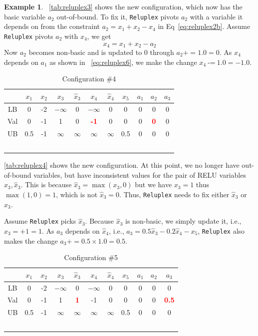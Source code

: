 \documentclass[oneside,11pt,dvipsnames]{book}
\numberwithin{equation}{section}
\theoremstyle{definition}
\newtheorem{example}{Example}[section]
\theoremstyle{remark}
\newcommand{\red}[1]{\textcolor{red}{#1}}
\newcommand{\reluplex}{\texttt{Reluplex}}
\begin{document}
\begin{example}
\begin{table}[h]
\end{table}

~\autoref{tab:reluplex3} shows the new configuration, which now has the basic variable $a_2$ out-of-bound.  To fix it, \reluplex{} pivots $a_2$ with a variable it depends on from the constraint $a_2 = x_1 + x_2 - x_4$ in Eq~\ref{eq:reluplex2b}.  Assume \reluplex{} pivots $a_2$ with $x_4$, we get
\begin{equation}\label{eq:reluplex6}
  x_4 = x_1 + x_2 - a_2
\end{equation}
Now $a_2$ becomes non-basic and is updated to 0 through $a_2+= 1.0 = 0$. As $x_4$ depends on $a_1$ as shown in ~\autoref{eq:reluplex6}, we make the change $x_4 ~\texttt{-=}~1.0 = -1.0$.


\begin{table}[h]
    \caption{Configuration \#4}\label{tab:reluplex4}
    \centering
    \small
\begin{tabular}{ccccccccccc}
     & $x_1$ & $x_2$ & $x_3$ & $\hat{x}_3$ & $x_4$ & $\hat{x}_4$ & $x_5$ &$a_1$&$a_2$&$a_3$ \\
    \midrule
    LB & 0 & -2 & $-\infty$&0&$-\infty$& 0 & 0 & 0 & 0 &0\\
    Val& 0 & -1 & 1 & 0 & \textbf{\red{-1}} & 0 & 0 & 0 & \textbf{\red{0}} & 0\\
    UB & 0.5 & -1 &$\infty$&$\infty$&$\infty$&$\infty$&0.5& 0 & 0 & 0\\\
\end{tabular}

\end{table}

\autoref{tab:reluplex4} shows the new configuration.
At this point, we no longer have out-of-bound variables, but have inconsistent values for the pair of RELU variables $x_3, \hat{x}_3$. This is because $\hat{x}_3 = \max(x_3,0)$ but  we have $x_3=1$ thus $\max(1,0)=1$, which is not $\hat{x}_3=0$.  Thus, \reluplex{} needs to fix either $\hat{x}_3$ or $x_3$.

Assume \reluplex{} picks $\hat{x}_3$. Because $\hat{x}_3$ is non-basic, we simply update it, i.e.,  $\hat{x}_3 = \text{+} 1 = 1$.  As $a_3$ depends on $\hat{x}_4$, i.e., $ a_3 = 0.5\hat{x}_3 -0.2 \hat{x}_4 - x_5$, \reluplex{} also makes the change $a_3+= 0.5\times 1.0=0.5$.



\begin{table}[h]
    \caption{Configuration \#5}\label{tab:reluplex5}
    \centering
    \small
\begin{tabular}{ccccccccccc}
     & $x_1$ & $x_2$ & $x_3$ & $\hat{x}_3$ & $x_4$ & $\hat{x}_4$ & $x_5$ &$a_1$&$a_2$&$a_3$ \\
    \midrule
    LB & 0 & -2 & $-\infty$&0&$-\infty$& 0 & 0 & 0 & 0 &0\\
    Val& 0 & -1 & 1 & \textbf{\red{1}} & -1 & 0 & 0 & 0 & 0 & \textbf{\red{0.5}}\\
    UB & 0.5 & -1 &$\infty$&$\infty$&$\infty$&$\infty$&0.5& 0 & 0 & 0\\\
\end{tabular}


\end{table}
\end{example}
\end{document}
